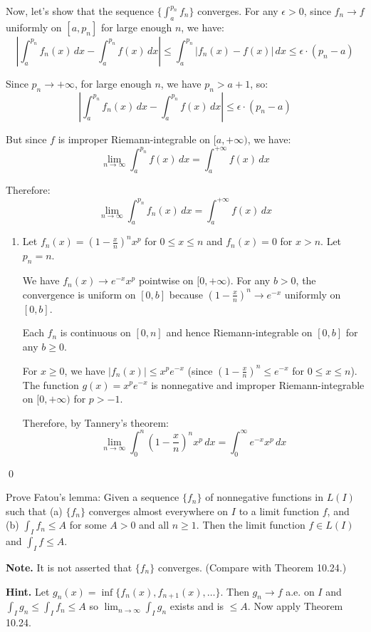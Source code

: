 Now, let's show that the sequence $\{\int_a^{p_n} f_n\}$ converges. For any $\epsilon > 0$, since $f_n \to f$ uniformly on $[a, p_n]$ for large enough $n$, we have:
\[|\int_a^{p_n} f_n(x) \, dx - \int_a^{p_n} f(x) \, dx| \leq \int_a^{p_n} |f_n(x) - f(x)| \, dx \leq \epsilon \cdot (p_n - a)\]

Since $p_n \to +\infty$, for large enough $n$, we have $p_n > a + 1$, so:
\[|\int_a^{p_n} f_n(x) \, dx - \int_a^{p_n} f(x) \, dx| \leq \epsilon \cdot (p_n - a)\]

But since $f$ is improper Riemann-integrable on $[a,+\infty)$, we have:
\[\lim_{n \to \infty} \int_a^{p_n} f(x) \, dx = \int_a^{+\infty} f(x) \, dx\]

Therefore:
\[\lim_{n \to \infty} \int_a^{p_n} f_n(x) \, dx = \int_a^{+\infty} f(x) \, dx\]

\begin{enumerate}[label=(\alph*),resume]
\item Let $f_n(x) = (1 - \frac{x}{n})^n x^p$ for $0 \leq x \leq n$ and $f_n(x) = 0$ for $x > n$. Let $p_n = n$.

We have $f_n(x) \to e^{-x}x^p$ pointwise on $[0,+\infty)$. For any $b > 0$, the convergence is uniform on $[0,b]$ because $(1 - \frac{x}{n})^n \to e^{-x}$ uniformly on $[0,b]$.

Each $f_n$ is continuous on $[0,n]$ and hence Riemann-integrable on $[0,b]$ for any $b \geq 0$.

For $x \geq 0$, we have $|f_n(x)| \leq x^p e^{-x}$ (since $(1 - \frac{x}{n})^n \leq e^{-x}$ for $0 \leq x \leq n$). The function $g(x) = x^p e^{-x}$ is nonnegative and improper Riemann-integrable on $[0,+\infty)$ for $p > -1$.

Therefore, by Tannery's theorem:
\[\lim_{n \to \infty} \int_{0}^{n} \left( 1 - \frac{x}{n} \right)^n x^p \, dx = \int_{0}^{\infty} e^{-x}x^p \, dx\]
\end{enumerate}\qed


\begin{problembox}
\begin{problemstatement}
Prove Fatou's lemma: Given a sequence $\{f_n\}$ of nonnegative functions in $L(I)$ such that (a) $\{f_n\}$ converges almost everywhere on $I$ to a limit function $f$, and (b) $\int_I f_n \leq A$ for some $A > 0$ and all $n \geq 1$. Then the limit function $f \in L(I)$ and $\int_I f \leq A$.

\textbf{Note.} It is not asserted that $\{f_n\}$ converges. (Compare with Theorem 10.24.)

\textbf{Hint.} Let $g_n(x) = \inf \{f_n(x), f_{n+1}(x), \ldots\}$. Then $g_n \to f$ a.e. on $I$ and $\int_I g_n \leq \int_I f_n \leq A$ so $\lim_{n \to \infty} \int_I g_n$ exists and is $\leq A$. Now apply Theorem 10.24.
\end{problemstatement}
\end{problembox}


